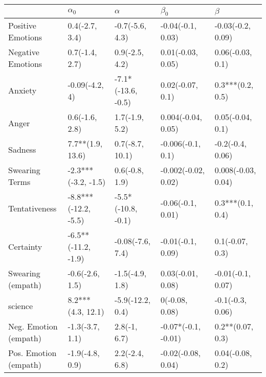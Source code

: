 \begin{tabular}{lllll}
\toprule
{} &            $\alpha_0$ &            $\alpha$ &            $\beta_0$ &             $\beta$ \\
\midrule
Positive Emotions     &        0.4(-2.7, 3.4) &     -0.7(-5.6, 4.3) &    -0.04(-0.1, 0.03) &   -0.03(-0.2, 0.09) \\
Negative Emotions     &        0.7(-1.4, 2.7) &      0.9(-2.5, 4.2) &    0.01(-0.03, 0.05) &    0.06(-0.03, 0.1) \\
Anxiety               &        -0.09(-4.2, 4) &  -7.1*(-13.6, -0.5) &     0.02(-0.07, 0.1) &    0.3***(0.2, 0.5) \\
Anger                 &        0.6(-1.6, 2.8) &      1.7(-1.9, 5.2) &   0.004(-0.04, 0.05) &    0.05(-0.04, 0.1) \\
Sadness               &      7.7**(1.9, 13.6) &     0.7(-8.7, 10.1) &    -0.006(-0.1, 0.1) &    -0.2(-0.4, 0.06) \\
Swearing Terms        &   -2.3***(-3.2, -1.5) &      0.6(-0.8, 1.9) &  -0.002(-0.02, 0.02) &  0.008(-0.03, 0.04) \\
Tentativeness         &  -8.8***(-12.2, -5.5) &  -5.5*(-10.8, -0.1) &    -0.06(-0.1, 0.01) &    0.3***(0.1, 0.4) \\
Certainty             &   -6.5**(-11.2, -1.9) &    -0.08(-7.6, 7.4) &    -0.01(-0.1, 0.09) &     0.1(-0.07, 0.3) \\
Swearing (empath)     &       -0.6(-2.6, 1.5) &     -1.5(-4.9, 1.8) &    0.03(-0.01, 0.08) &   -0.01(-0.1, 0.07) \\
science               &     8.2***(4.3, 12.1) &    -5.9(-12.2, 0.4) &       0(-0.08, 0.08) &    -0.1(-0.3, 0.06) \\
Neg. Emotion (empath) &       -1.3(-3.7, 1.1) &        2.8(-1, 6.7) &  -0.07*(-0.1, -0.01) &    0.2**(0.07, 0.3) \\
Pos. Emotion (empath) &       -1.9(-4.8, 0.9) &      2.2(-2.4, 6.8) &   -0.02(-0.08, 0.04) &    0.04(-0.08, 0.2) \\
\bottomrule
\end{tabular}
